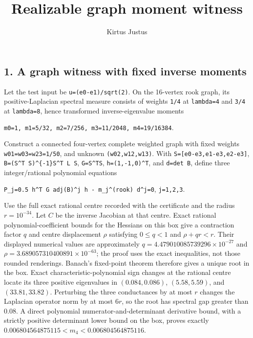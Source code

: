 \documentclass[
  10pt,
  a4paper,
]{article}
\title{Realizable graph moment witness}
\author{Kirtus Justus}
\date{}
\begin{document}
\maketitle

\subsection{1. A graph witness with fixed inverse moments}\label{a-graph-witness-with-fixed-inverse-moments}

Let the test input be \texttt{u=(e0-e1)/sqrt(2)}. On the 16-vertex rook graph, its positive-Laplacian spectral measure consists of weights \texttt{1/4} at \texttt{lambda=4} and \texttt{3/4} at \texttt{lambda=8}, hence transformed inverse-eigenvalue moments

\texttt{m0=1,\ m1=5/32,\ m2=7/256,\ m3=11/2048,\ m4=19/16384}.

Construct a connected four-vertex complete weighted graph with fixed weights \texttt{w01=w03=w23=1/50}, and unknown \texttt{(w02,w12,w13)}. With \texttt{S={[}e0-e3,e1-e3,e2-e3{]}}, \texttt{B=(S\^{}T\ S)\^{}\{-1\}S\^{}T\ L\ S}, \texttt{G=S\^{}TS}, \texttt{h=(1,-1,0)\^{}T}, and \texttt{d=det\ B}, define three integer/rational polynomial equations

\texttt{P\_j=0.5\ h\^{}T\ G\ adj(B)\^{}j\ h\ -\ m\_j\^{}(rook)\ d\^{}j=0}, \texttt{j=1,2,3}.

Use the full exact rational centre recorded with the certificate and the radius \(r=10^{-34}\). Let \(C\) be the inverse Jacobian at that centre. Exact rational polynomial-coefficient bounds for the Hessians on this box give a contraction factor \(q\) and centre displacement \(\rho\) satisfying \(0\le q<1\) and \(\rho+qr<r\). Their displayed numerical values are approximately \(q=4.479010085739296\times10^{-27}\) and \(\rho=3.689057310400891\times10^{-63}\); the proof uses the exact inequalities, not those rounded renderings. Banach's fixed-point theorem therefore gives a unique root in the box. Exact characteristic-polynomial sign changes at the rational centre locate its three positive eigenvalues in \((0.084,0.086)\), \((5.58,5.59)\), and \((33.81,33.82)\). Perturbing the three conductances by at most \(r\) changes the Laplacian operator norm by at most \(6r\), so the root has spectral gap greater than \(0.08\). A direct polynomial numerator-and-determinant derivative bound, with a strictly positive determinant lower bound on the box, proves exactly \(0.006804564875115<m_4<0.006804564875116\).
\end{document}
